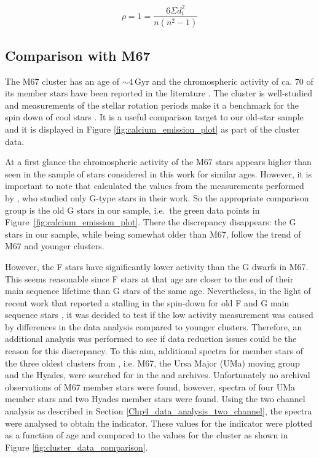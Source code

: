\begin{equation}
    \rho = 1 = \frac{6\Sigma d_{i}^{2}}{n(n^{2}-1)}
    \label{Eq:spearman_rank_coeff}
\end{equation}

\subsection{Comparison with M67}
The M67 cluster has an age of $\sim 4$\,Gyr \citep{Demarque_etal_1992,VandenBerg_Stetson_2004,Bellini_etal_2010} and the chromospheric activity of ca. 70 of its member stars have been reported in the literature \citep{Giampapa_etal_2006,Mamajek_Hillenbrand_2008}. The cluster is well-studied and measurements of the stellar rotation periods make it a benchmark for the spin down of cool stars \citep{Barnes_etal_2016}. It is a useful comparison target to our old-star sample and it is displayed in Figure \ref{fig:calcium_emission_plot} as part of the \citet{Mamajek_Hillenbrand_2008} cluster data.

At a first glance the chromospheric activity of the M67 stars appears higher than seen in the sample of stars considered in this work for similar ages. However, it is important to note that \citealt{Mamajek_Hillenbrand_2008} calculated the \Rprime values from the measurements performed by \citealt{Giampapa_etal_2006}, who studied only G-type stars in their work. So the appropriate comparison group is the old G stars in our sample, i.e.\ the green data points in Figure~\ref{fig:calcium_emission_plot}. There the discrepancy disappears: the G stars in our sample, while being somewhat older than M67, follow the trend of M67 and younger clusters.

However, the F stars have significantly lower activity than the G dwarfs in M67. This seems reasonable since F stars at that age are closer to the end of their main sequence lifetime than G stars of the same age. Nevertheless, in the light of recent work that reported a stalling in the spin-down for old F and G main sequence stars \citep{van_Saders_etal_2016}, it was decided to test if the low activity measurement was caused by differences in the data analysis compared to younger clusters. Therefore, an additional analysis was performed to see if data reduction issues could be the reason for this discrepancy. To this aim, additional spectra for member stars of the three oldest clusters from \citet{Mamajek_Hillenbrand_2008}, i.e. M67, the Ursa Major (UMa) moving group and the Hyades, were searched for in the \esp and \narval archives. Unfortunately no archival observations of M67 member stars were found, however, spectra of four UMa member stars and two Hyades member stars were found. Using the two channel analysis as described in Section \ref{Chp4_data_analysis_two_channel}, the spectra were analysed to obtain the \Rprime indicator. These values for the \Rprime indicator were plotted as a function of age and compared to the \citet{Mamajek_Hillenbrand_2008} values for the cluster as shown in Figure \ref{fig:cluster_data_comparison}. 

